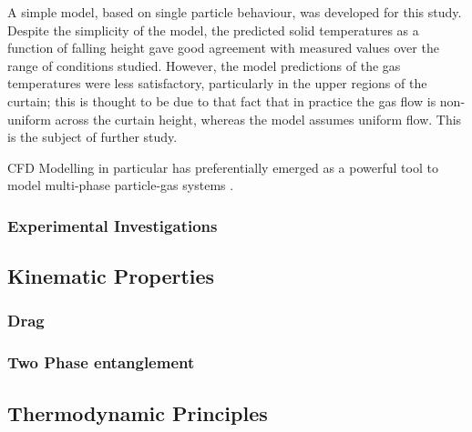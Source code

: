 \documentclass[12pt]{article}
\newcommand{\ts}{\textsuperscript}
\newcommand{\mycite}[1]{\ts{\cite{#1}}}
\begin{document}
A simple model,
based on single particle behaviour, was developed for this study.
Despite the simplicity of the model, the predicted solid temperatures
as a function of falling height gave good agreement with measured
values over the range of conditions studied. However, the model
predictions of the gas temperatures were less satisfactory, particularly
in the upper regions of the curtain; this is thought to be due to that
fact that in practice the gas flow is non-uniform across the curtain
height, whereas the model assumes uniform flow. This is the subject of
further study. \mycite{wardjiman2009heat} \mycite{fundementalsParticleTransport}



CFD Modelling in particular has preferentially emerged as a powerful tool to model multi-phase particle-gas systems \mycite{AfsharCurtainPhd}.


\subsubsection{Experimental Investigations}


\subsection{Kinematic Properties} 

\subsubsection{Drag}

\subsubsection{Two Phase entanglement}

\subsection{Thermodynamic Principles} 
\end{document}
